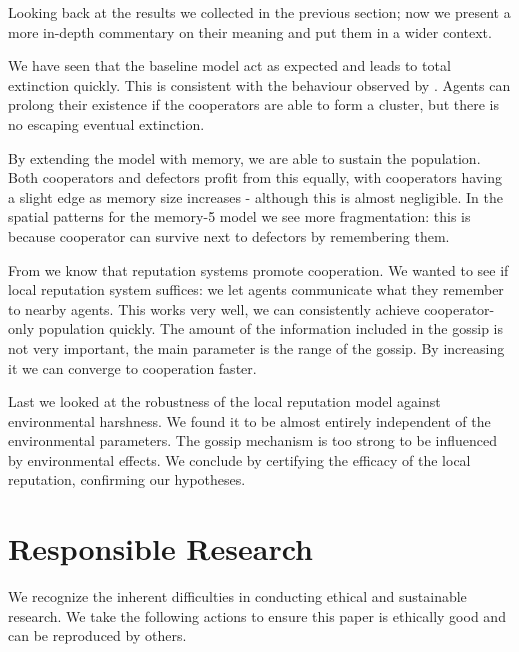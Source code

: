 \documentclass[english]{article}
\begin{document}
Looking back at the results we collected in the previous section;
now we present a more in-depth commentary on their meaning and
put them in a wider context.

We have seen that the baseline model act as expected and leads to total extinction quickly.
This is consistent with the behaviour observed by \citet{smaldino}.
Agents can prolong their existence if the cooperators are able to form a cluster,
but there is no escaping eventual extinction.

By extending the model with memory, we are able to sustain the population.
Both cooperators and defectors profit from this equally, with cooperators having a slight edge
as memory size increases - although this is almost negligible.
In the spatial patterns for the memory-5 model we see more fragmentation: this is because cooperator can survive next to defectors by remembering them.

From \citet{simple-reputation, public-private-monitoring} we know that reputation systems promote cooperation.
We wanted to see if local reputation system suffices: we let agents communicate what they remember to nearby agents.
This works very well, we can consistently achieve cooperator-only population quickly.
The amount of the information included in the gossip is not very important, the main parameter is the range of the gossip. By increasing it we can converge to cooperation faster.

Last we looked at the robustness of the local reputation model against environmental harshness.
We found it to be almost entirely independent of the environmental parameters.
The gossip mechanism is too strong to be influenced by environmental effects.
We conclude by certifying the efficacy of the local reputation, confirming our hypotheses.



\section{Responsible Research}
We recognize the inherent difficulties in conducting ethical and sustainable research.
We take the following actions to ensure this paper is ethically good and can be reproduced by others.
\end{document}
